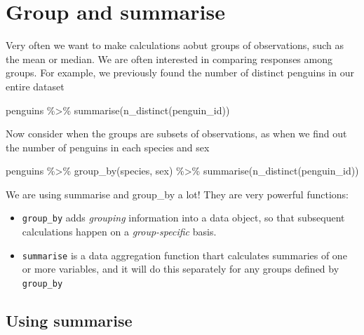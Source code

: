 \documentclass[
]{book}
\newenvironment{Shaded}{\begin{snugshade}}{\end{snugshade}}
\newcommand{\FunctionTok}[1]{\textcolor[rgb]{0.00,0.00,0.00}{#1}}
\newcommand{\NormalTok}[1]{#1}
\newcommand{\SpecialCharTok}[1]{\textcolor[rgb]{0.00,0.00,0.00}{#1}}
\begin{document}
\hypertarget{group-and-summarise}{%
\section{Group and summarise}\label{group-and-summarise}}

Very often we want to make calculations aobut groups of observations, such as the mean or median. We are often interested in comparing responses among groups. For example, we previously found the number of distinct penguins in our entire dataset

\begin{Shaded}
\begin{Highlighting}[]
\NormalTok{penguins }\SpecialCharTok{\%\textgreater{}\%} 
  \FunctionTok{summarise}\NormalTok{(}\FunctionTok{n\_distinct}\NormalTok{(penguin\_id))}
\end{Highlighting}
\end{Shaded}

Now consider when the groups are subsets of observations, as when we find out the number of penguins in each species and sex

\begin{Shaded}
\begin{Highlighting}[]
\NormalTok{penguins }\SpecialCharTok{\%\textgreater{}\%} 
  \FunctionTok{group\_by}\NormalTok{(species, sex) }\SpecialCharTok{\%\textgreater{}\%} 
  \FunctionTok{summarise}\NormalTok{(}\FunctionTok{n\_distinct}\NormalTok{(penguin\_id))}
\end{Highlighting}
\end{Shaded}

We are using summarise and group\_by a lot! They are very powerful functions:

\begin{itemize}
\item
  \texttt{group\_by} adds \emph{grouping} information into a data object, so that subsequent calculations happen on a \emph{group-specific} basis.
\item
  \texttt{summarise} is a data aggregation function thart calculates summaries of one or more variables, and it will do this separately for any groups defined by \texttt{group\_by}
\end{itemize}

\hypertarget{using-summarise}{%
\subsection{Using summarise}\label{using-summarise}}
\end{document}
